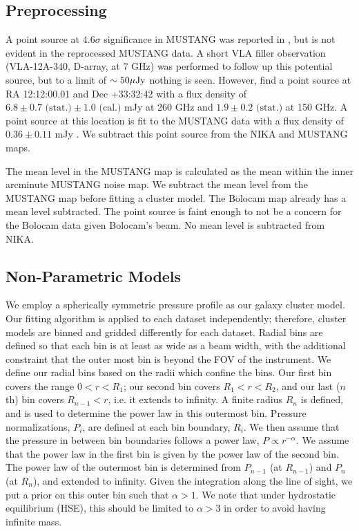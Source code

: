 \documentclass[iop,numberedappendix,apj]{emulateapj}
\begin{document}
\subsection{Preprocessing}
\label{sec:preprocessing}

A point source at $4.6\sigma$ significance in MUSTANG was reported in \citet{korngut2011}, but is not
evident in the reprocessed MUSTANG data. A short VLA filler observation (VLA-12A-340, D-array, at 7 GHz) 
was performed to follow up this potential source, but to a limit of $\sim 50 {\rm \mu Jy}$ nothing is seen.
However, \citet{adam2015} find a point source at RA 12:12:00.01 and Dec +33:32:42 with a flux density of 
$6.8 \pm 0.7 \text{ (stat.)} \pm 1.0 \text{ (cal.)}$ mJy at 260 GHz and $1.9 \pm 0.2 \text{ (stat.)}$ at 150 GHz. 
A point source at this location is fit to the MUSTANG data with a flux density of $0.36 \pm 0.11$ mJy
\citep{romero2016}. We subtract this point source from the NIKA and MUSTANG maps.

The mean level in the MUSTANG map is calculated as the mean within the inner arcminute MUSTANG noise map. 
We subtract the mean level from the MUSTANG map before fitting a cluster model. The Bolocam map already has
a mean level subtracted.  The point source is faint enough to not be a concern for the Bolocam data given
Bolocam's beam. No mean level is subtracted from NIKA.

\subsection{Non-Parametric Models}
\label{sec:np_models}

We employ a spherically symmetric pressure profile as our galaxy cluster model. Our fitting algorithm is applied
to each dataset independently; therefore, cluster models are binned and gridded differently for each dataset.
Radial bins are defined so that
each bin is at least as wide as a beam width, with the additional constraint that the outer most bin is beyond
the FOV of the instrument. We define our radial bins based on the radii which confine the bins. Our first bin
covers the range $0 < r < R_1$; our second bin covers $R_1 < r < R_2$, and our last ($n$th) bin covers
$R_{n-1} < r $, i.e. it extends to infinity. A finite radius $R_n$ is defined, and is used to determine the power
law in this outermost bin. Pressure normalizations, $P_i$, are defined at each bin boundary, $R_i$. We then assume
that the pressure in between bin boundaries follows a power law, $P \propto r^{-\alpha}$. We assume that the power
law in the first bin is given by the power law of the second bin.
The power law of the outermost bin is determined from $P_{n-1}$ (at $R_{n-1}$) and $P_{n}$ (at $R_{n}$), and extended
to infinity. Given the integration along the line of sight, we put a prior on this outer bin such that $\alpha > 1$.
We note that under hydrostatic equilibrium (HSE), this should be limited to $\alpha >3$ in order to avoid having
infinite mass.
\end{document}
